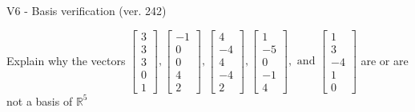 \begin{exercise}
  \begin{exerciseTitle}V6 - Basis verification (ver. 242)\end{exerciseTitle}
  \begin{exerciseStatement}
    Explain why the vectors \(\left[\begin{array}{r}
3 \\
3 \\
3 \\
0 \\
1
\end{array}\right] , \left[\begin{array}{r}
-1 \\
0 \\
0 \\
4 \\
2
\end{array}\right] , \left[\begin{array}{r}
4 \\
-4 \\
4 \\
-4 \\
2
\end{array}\right] , \left[\begin{array}{r}
1 \\
-5 \\
0 \\
-1 \\
4
\end{array}\right] , \text{ and } \left[\begin{array}{r}
1 \\
3 \\
-4 \\
1 \\
0
\end{array}\right]\) are or are not a basis of \(\mathbb{R}^5\)	



\end{exerciseStatement}
\end{exercise}
